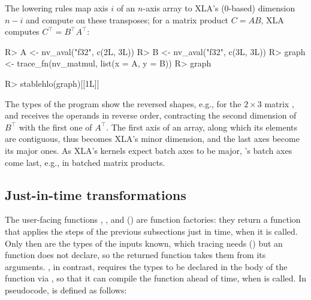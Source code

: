 \documentclass[article,shortnames]{jss}
\renewenvironment{CodeChunk}{\par\addvspace{0.6\baselineskip}\noindent\begin{minipage}{\linewidth}}{\end{minipage}\par\vspace{0.6\baselineskip}}
\newcommand{\fitcode}{\fvset{fontsize=\small}}
\begin{document}
The lowering rules map axis $i$ of an $n$-axis array to XLA's (0-based) dimension $n - i$ and compute on these transposes; for a matrix product $C = AB$, XLA computes $C^\top = B^\top A^\top$:

\begin{CodeChunk}
\fitcode
\begin{CodeInput}
R> A <- nv_aval("f32", c(2L, 3L))
R> B <- nv_aval("f32", c(3L, 3L))
R> graph <- trace_fn(nv_matmul, list(x = A, y = B))
R> graph
\end{CodeInput}
\begin{CodeInput}
R> stablehlo(graph)[[1L]]
\end{CodeInput}
\end{CodeChunk}

The types of the program show the reversed shapes, e.g.,  for the $2 \times 3$ matrix , and  receives the operands in reverse order, contracting the second dimension of $B^\top$ with the first one of $A^\top$.
The first axis of an  array, along which its elements are contiguous, thus becomes XLA's minor dimension, and the last axes become its major ones.
As XLA's kernels expect batch axes to be major, 's batch axes come last, e.g., in batched matrix products.

\subsection{Just-in-time transformations}\label{dispatch}

The user-facing functions , , and  () are function factories: they return a function that applies the steps of the previous subsections just in time, when it is called.
Only then are the types of the inputs known, which tracing needs () but an  function does not declare, so the returned function takes them from its arguments.
, in contrast, requires the types to be declared in the body of the function via , so that it can compile the function ahead of time, when  is called.
In pseudocode,  is defined as follows:
\end{document}

